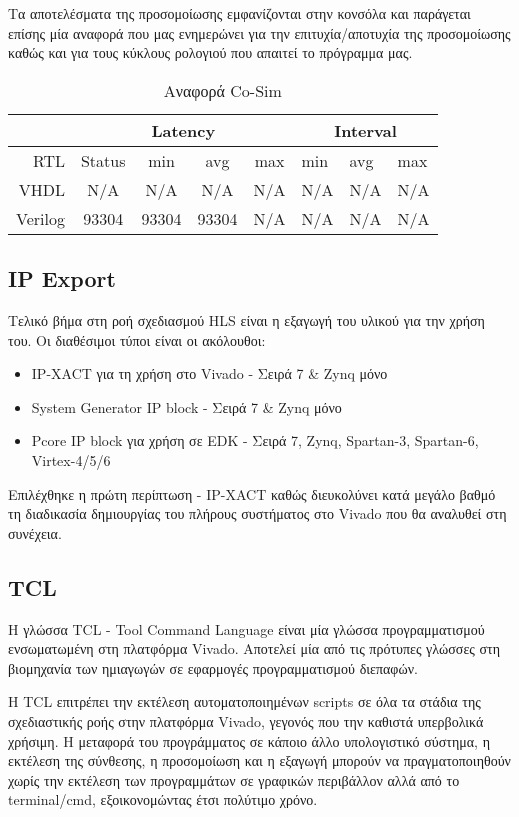 Τα αποτελέσματα της προσομοίωσης εμφανίζονται στην κονσόλα και παράγεται επίσης μία αναφορά που μας ενημερώνει για την επιτυχία/αποτυχία της προσομοίωσης καθώς και για τους κύκλους ρολογιού που απαιτεί το πρόγραμμα μας.
\begin{table}[H]
\centering
\caption{Αναφορά Co-Sim}
\label{my-label}
\begin{tabular}{@{}rcccclll@{}}
\toprule
\multicolumn{1}{l}{} & \multicolumn{4}{c}{Latency} & \multicolumn{3}{c}{Interval} \\ \midrule
RTL & Status & min & avg & max & min & avg & max \\
VHDL & N/A & N/A  & N/A  & N/A  & N/A & N/A & N/A \\
Verilog & 93304  & 93304  & 93304  & N/A & N/A & N/A & N/A \\ \bottomrule
\end{tabular}
\end{table}

\subsection{IP Export}

Τελικό βήμα στη ροή σχεδιασμού HLS είναι η εξαγωγή του υλικού για την χρήση του. Οι διαθέσιμοι τύποι είναι οι ακόλουθοι:
\begin{itemize}[leftmargin=*]
	\item{IP-XACT για τη χρήση στο Vivado - Σειρά 7 \& Zynq μόνο}
	\item{System Generator IP block - Σειρά 7 \& Zynq μόνο}
	\item{Pcore IP block για χρήση σε EDK - Σειρά 7, Zynq, Spartan-3, Spartan-6, Virtex-4/5/6} \\
\end{itemize}

Επιλέχθηκε η πρώτη περίπτωση - IP-XACT καθώς διευκολύνει κατά μεγάλο βαθμό τη διαδικασία δημιουργίας του πλήρους συστήματος στο Vivado που θα αναλυθεί στη συνέχεια.
\subsection{TCL}

Η γλώσσα TCL - Tool Command Language είναι μία γλώσσα προγραμματισμού ενσωματωμένη στη πλατφόρμα Vivado. Αποτελεί μία από τις πρότυπες γλώσσες στη βιομηχανία των ημιαγωγών σε εφαρμογές προγραμματισμού διεπαφών.

Η TCL επιτρέπει την εκτέλεση αυτοματοποιημένων scripts σε όλα τα στάδια της σχεδιαστικής ροής στην πλατφόρμα Vivado, γεγονός που την καθιστά υπερβολικά χρήσιμη. Η μεταφορά του προγράμματος σε κάποιο άλλο υπολογιστικό σύστημα, η εκτέλεση της σύνθεσης, η προσομοίωση και η εξαγωγή μπορούν να πραγματοποιηθούν χωρίς την εκτέλεση των προγραμμάτων σε γραφικών περιβάλλον αλλά από το terminal/cmd, εξοικονομώντας έτσι πολύτιμο χρόνο.

